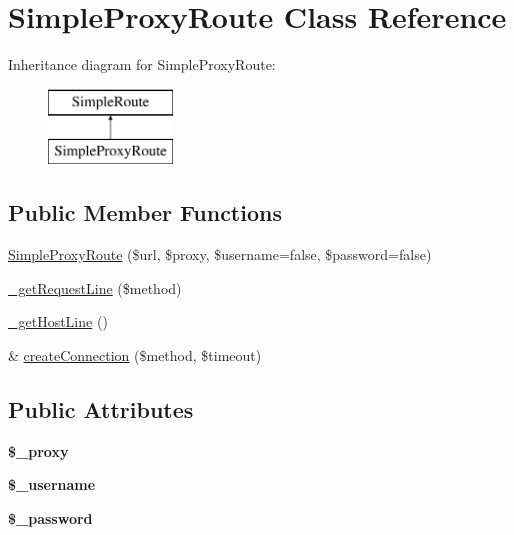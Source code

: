 \hypertarget{class_simple_proxy_route}{
\section{SimpleProxyRoute Class Reference}
\label{class_simple_proxy_route}
}
Inheritance diagram for SimpleProxyRoute:\begin{figure}[H]
\begin{center}
\leavevmode
\includegraphics[height=2.000000cm]{class_simple_proxy_route}
\end{center}
\end{figure}
\subsection*{Public Member Functions}
\begin{DoxyCompactItemize}
\item 
\hyperlink{class_simple_proxy_route_ae9dd2dbfe339569ce5fb6a68162de1a9}{SimpleProxyRoute} (\$url, \$proxy, \$username=false, \$password=false)
\item 
\hyperlink{class_simple_proxy_route_a47e158c297e31c2a2988a3a7d586ffb2}{\_\-getRequestLine} (\$method)
\item 
\hyperlink{class_simple_proxy_route_a5b9617cdd91cbcc393ea84097b5b16ce}{\_\-getHostLine} ()
\item 
\& \hyperlink{class_simple_proxy_route_a1741241e4a4d7ed555adf373008c7cf0}{createConnection} (\$method, \$timeout)
\end{DoxyCompactItemize}
\subsection*{Public Attributes}
\begin{DoxyCompactItemize}
\item 
\hypertarget{class_simple_proxy_route_ab9bbd988844052f0f2dabc50ab04e389}{
{\bfseries \$\_\-proxy}}
\label{class_simple_proxy_route_ab9bbd988844052f0f2dabc50ab04e389}

\item 
\hypertarget{class_simple_proxy_route_af2a2ba8d79eabf9178e587d9471560e0}{
{\bfseries \$\_\-username}}
\label{class_simple_proxy_route_af2a2ba8d79eabf9178e587d9471560e0}

\item 
\hypertarget{class_simple_proxy_route_a11dcc837ca3d7e857996503d5112feec}{
{\bfseries \$\_\-password}}
\label{class_simple_proxy_route_a11dcc837ca3d7e857996503d5112feec}

\end{DoxyCompactItemize}


